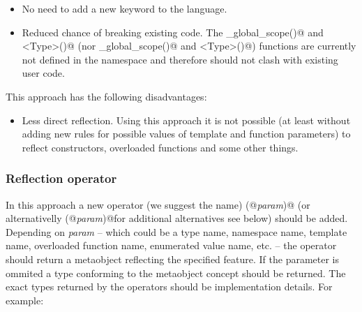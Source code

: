 \begin{itemize}
	\item No need to add a new keyword to the language.

	\item Reduced chance of breaking existing code. The \verb@reflected_global_scope()@
	and \verb@reflected<Type>()@ (nor \verb@mirrored_global_scope()@ and 
	\verb@mirrored<Type>()@) functions are currently not defined in the \verb@std@
	namespace and therefore should not clash with existing user code.
\end{itemize}

This approach has the following disadvantages:

\begin{itemize}
	\item Less direct reflection. Using this approach it is not possible
	(at least without adding new rules for possible values of template
	and function parameters) to reflect constructors, overloaded functions
	and some other things.
\end{itemize}

\subsubsection{Reflection operator}

In this approach a new operator (we suggest the name) \verb@mirrored(@{\em param}\verb@)@
(or alternativelly \verb@reflected(@{\em param}\verb@)@for additional alternatives see below)
should be added.
Depending on {\em param} -- which could be a type name, namespace name,
template name, overloaded function name, enumerated value name, etc. -- the operator should
return a {} metaobject reflecting the specified feature.
If the parameter is ommited a type conforming to the {} metaobject
concept should be returned.
The exact types returned by the operators should be implementation details.
For example:

